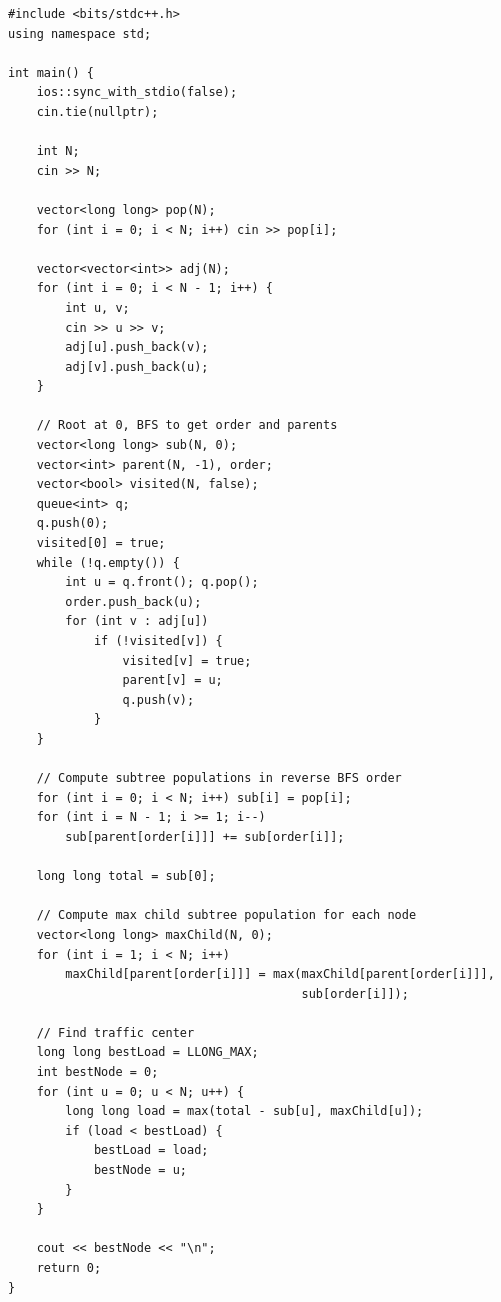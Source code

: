 \documentclass[11pt,a4paper]{article}
\begin{document}
\begin{lstlisting}
#include <bits/stdc++.h>
using namespace std;

int main() {
    ios::sync_with_stdio(false);
    cin.tie(nullptr);

    int N;
    cin >> N;

    vector<long long> pop(N);
    for (int i = 0; i < N; i++) cin >> pop[i];

    vector<vector<int>> adj(N);
    for (int i = 0; i < N - 1; i++) {
        int u, v;
        cin >> u >> v;
        adj[u].push_back(v);
        adj[v].push_back(u);
    }

    // Root at 0, BFS to get order and parents
    vector<long long> sub(N, 0);
    vector<int> parent(N, -1), order;
    vector<bool> visited(N, false);
    queue<int> q;
    q.push(0);
    visited[0] = true;
    while (!q.empty()) {
        int u = q.front(); q.pop();
        order.push_back(u);
        for (int v : adj[u])
            if (!visited[v]) {
                visited[v] = true;
                parent[v] = u;
                q.push(v);
            }
    }

    // Compute subtree populations in reverse BFS order
    for (int i = 0; i < N; i++) sub[i] = pop[i];
    for (int i = N - 1; i >= 1; i--)
        sub[parent[order[i]]] += sub[order[i]];

    long long total = sub[0];

    // Compute max child subtree population for each node
    vector<long long> maxChild(N, 0);
    for (int i = 1; i < N; i++)
        maxChild[parent[order[i]]] = max(maxChild[parent[order[i]]],
                                         sub[order[i]]);

    // Find traffic center
    long long bestLoad = LLONG_MAX;
    int bestNode = 0;
    for (int u = 0; u < N; u++) {
        long long load = max(total - sub[u], maxChild[u]);
        if (load < bestLoad) {
            bestLoad = load;
            bestNode = u;
        }
    }

    cout << bestNode << "\n";
    return 0;
}
\end{lstlisting}
\end{document}
